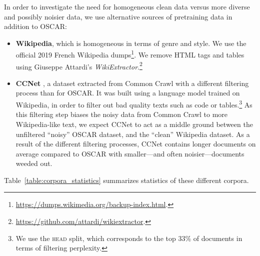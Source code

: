 \documentclass[11pt,a4paper]{article}
\newcommand{\ccnet}{CCNet\xspace}
\newcommand{\oscar}{OSCAR\xspace}
\begin{document}
In order to investigate the need for homogeneous clean data versus more diverse and possibly noisier data, we use alternative sources of pretraining data in addition to \oscar:
\begin{itemize}
    \item \textbf{Wikipedia}, which is homogeneous in terms of genre and style. We use the official 2019 French Wikipedia dumps\footnote{ \url{https://dumps.wikimedia.org/backup-index.html}.}. We remove HTML tags and tables using Giuseppe Attardi's  \emph{WikiExtractor}.\footnote{ \url{https://github.com/attardi/wikiextractor}.}
    \item \textbf{\ccnet} \cite{wenzek2019ccnet}, a dataset extracted from Common Crawl with a different filtering process than for \oscar. It was built using a language model trained on Wikipedia, in order to filter out bad quality texts such as code or tables.\footnote{We use the \textsc{head} split, which corresponds to the top 33\% of documents in terms of filtering perplexity.} As this filtering step biases the noisy data from Common Crawl to more Wikipedia-like text, we expect \ccnet to act as a middle ground between the unfiltered ``noisy'' \oscar dataset, and the ``clean'' Wikipedia dataset. As a result of the different filtering processes, \ccnet contains longer documents on average compared to \oscar with smaller---and often noisier---documents weeded out.
\end{itemize}
Table~\ref{table:corpora_statistics} summarizes statistics of these different corpora.

\begin{table}[ht]
\centering\small
{}
\caption{Statistics on the pretraining datasets used.}
\label{table:corpora_statistics}
\end{table}
\end{document}
